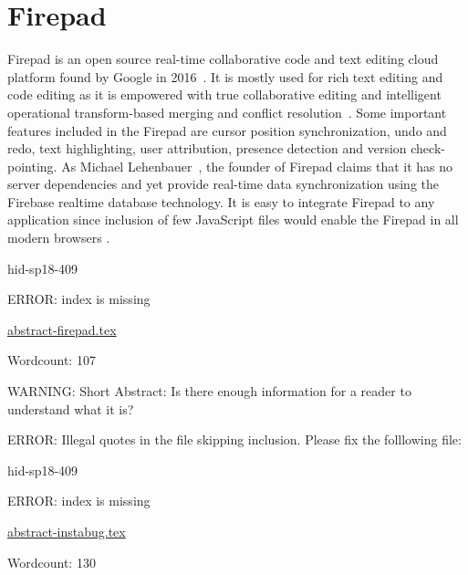 \section{Firepad}

Firepad is an open source real-time collaborative code and text editing cloud
platform found by Google in 2016~\cite{hid-sp18-409-www-firepad}.  It is mostly
used for rich text editing and code editing as it is empowered with true
collaborative editing and intelligent operational transform-based merging and
conflict resolution~\cite{hid-sp18-409-www-firepad-wikipedia}. Some important
features included in the Firepad are cursor position synchronization, undo and
redo, text highlighting, user attribution, presence detection and version
check-pointing. As Michael Lehenbauer~\cite{hid-sp18-409-www-firepad}, the
founder of Firepad claims that it has no server dependencies and yet provide
real-time data synchronization using the Firebase realtime database technology.
It is easy to integrate Firepad to any application since inclusion of few
JavaScript files would enable the Firepad in all modern browsers
\cite{hid-sp18-409-www-firepad}.


\begin{IU}

hid-sp18-409

ERROR: index is missing

\href{https://github.com/cloudmesh-community/hid-sp18-409/blob/master//technology/abstract-firepad.tex}{abstract-firepad.tex}

 

Wordcount: 107

WARNING: Short Abstract: Is there enough information for a reader to understand what it is?

\end{IU}

ERROR: Illegal quotes in the file skipping inclusion. Please fix the folllowing file:

\begin{IU}

hid-sp18-409

ERROR: index is missing

\href{https://github.com/cloudmesh-community/hid-sp18-409/blob/master//technology/abstract-instabug.tex}{abstract-instabug.tex}

 

Wordcount: 130

\end{IU}

